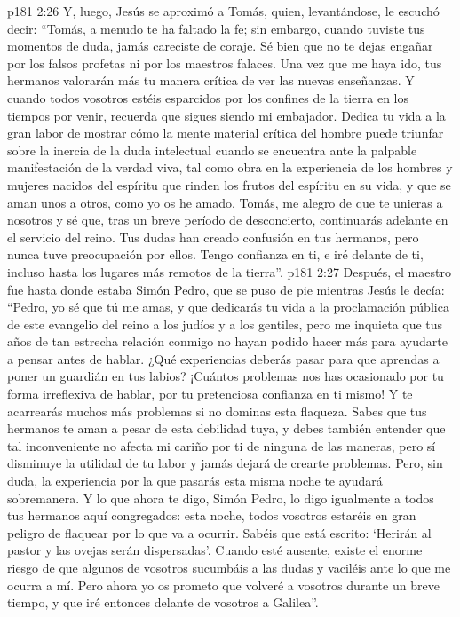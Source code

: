 \vs p181 2:26 \pc Y, luego, Jesús se aproximó a Tomás, quien, levantándose, le escuchó decir: “Tomás, a menudo te ha faltado la fe; sin embargo, cuando tuviste tus momentos de duda, jamás careciste de coraje. Sé bien que no te dejas engañar por los falsos profetas ni por los maestros falaces. Una vez que me haya ido, tus hermanos valorarán más tu manera crítica de ver las nuevas enseñanzas. Y cuando todos vosotros estéis esparcidos por los confines de la tierra en los tiempos por venir, recuerda que sigues siendo mi embajador. Dedica tu vida a la gran labor de mostrar cómo la mente material crítica del hombre puede triunfar sobre la inercia de la duda intelectual cuando se encuentra ante la palpable manifestación de la verdad viva, tal como obra en la experiencia de los hombres y mujeres nacidos del espíritu que rinden los frutos del espíritu en su vida, y que se aman unos a otros, como yo os he amado. Tomás, me alegro de que te unieras a nosotros y sé que, tras un breve período de desconcierto, continuarás adelante en el servicio del reino. Tus dudas han creado confusión en tus hermanos, pero nunca tuve preocupación por ellos. Tengo confianza en ti, e iré delante de ti, incluso hasta los lugares más remotos de la tierra”.
\vs p181 2:27 \pc Después, el maestro fue hasta donde estaba Simón Pedro, que se puso de pie mientras Jesús le decía: “Pedro, yo sé que tú me amas, y que dedicarás tu vida a la proclamación pública de este evangelio del reino a los judíos y a los gentiles, pero me inquieta que tus años de tan estrecha relación conmigo no hayan podido hacer más para ayudarte a pensar antes de hablar. ¿Qué experiencias deberás pasar para que aprendas a poner un guardián en tus labios? ¡Cuántos problemas nos has ocasionado por tu forma irreflexiva de hablar, por tu pretenciosa confianza en ti mismo! Y te acarrearás muchos más problemas si no dominas esta flaqueza. Sabes que tus hermanos te aman a pesar de esta debilidad tuya, y debes también entender que tal inconveniente no afecta mi cariño por ti de ninguna de las maneras, pero sí disminuye la utilidad de tu labor y jamás dejará de crearte problemas. Pero, sin duda, la experiencia por la que pasarás esta misma noche te ayudará sobremanera. Y lo que ahora te digo, Simón Pedro, lo digo igualmente a todos tus hermanos aquí congregados: esta noche, todos vosotros estaréis en gran peligro de flaquear por lo que va a ocurrir. Sabéis que está escrito: ‘Herirán al pastor y las ovejas serán dispersadas’. Cuando esté ausente, existe el enorme riesgo de que algunos de vosotros sucumbáis a las dudas y vaciléis ante lo que me ocurra a mí. Pero ahora yo os prometo que volveré a vosotros durante un breve tiempo, y que iré entonces delante de vosotros a Galilea”.
